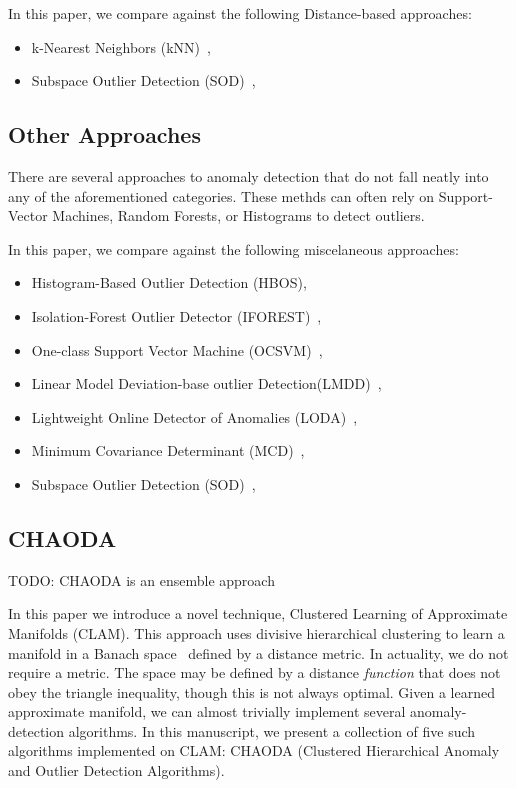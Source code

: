 In this paper, we compare against the following Distance-based approaches:
\begin{itemize}
    \item k-Nearest Neighbors (kNN)~\cite{ramaswamy2000efficient, sridhar2000knn, fabrizio2002knn},
    \item Subspace Outlier Detection (SOD)~\cite{kriegel2009sod},
\end{itemize}


\subsection{Other Approaches}
\label{subsec:introduction:other-appraoches}

There are several approaches to anomaly detection that do not fall neatly into any of the aforementioned categories.
These methds can often rely on Support-Vector Machines, Random Forests, or Histograms to detect outliers.

In this paper, we compare against the following miscelaneous approaches:
\begin{itemize}
    \item Histogram-Based Outlier Detection (HBOS)\cite{goldstein2012hbos},
    \item Isolation-Forest Outlier Detector (IFOREST)~\cite{tony2008iforest,tony2012iforest},
    \item One-class Support Vector Machine (OCSVM)~\cite{sholkopf2001ocsvm},
    \item Linear Model Deviation-base outlier Detection(LMDD)~\cite{arning1996lmdd},
    \item Lightweight Online Detector of Anomalies (LODA)~\cite{pevny2016loda},
    \item Minimum Covariance Determinant (MCD)~\cite{rousseeuw1999mcd,hardin2004mcd},
    \item Subspace Outlier Detection (SOD)~\cite{kriegel2009sod},
\end{itemize}


\subsection{CHAODA}
\label{subsec:introduction:chaoda}

TODO: CHAODA is an ensemble approach

In this paper we introduce a novel technique, Clustered Learning of Approximate Manifolds (CLAM).
This approach uses divisive hierarchical clustering to learn a manifold in a Banach space~\cite{banach1929fonctionnelles} defined by a distance metric.
In actuality, we do not require a metric.
The space may be defined by a distance \textit{function} that does not obey the triangle inequality, though this is not always optimal.
Given a learned approximate manifold, we can almost trivially implement several anomaly-detection algorithms.
In this manuscript, we present a collection of five such algorithms implemented on CLAM: CHAODA (Clustered Hierarchical Anomaly and Outlier Detection Algorithms).

